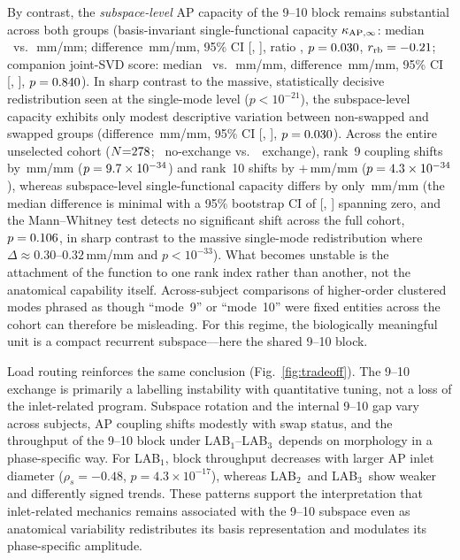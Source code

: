 \documentclass[11pt]{article}
\newcommand{\LABone}{LAB$_1$}
\newcommand{\LABtwo}{LAB$_2$}
\newcommand{\LABthree}{LAB$_3$}
\newcommand{\LAB}{LAB$_1$--LAB$_3$}
\begin{document}
By contrast, the \emph{subspace-level} AP capacity of the 9--10 block remains substantial across both groups (basis-invariant single-functional capacity $\kappa_{{\rm AP},\infty}$: median \ScalarAPNo\ vs.\ \ScalarAPYes\,mm/mm; difference \ScalarAPDifference\,mm/mm, 95\% CI [\ScalarAPLow, \ScalarAPHigh], ratio \ScalarAPRatio, $p = 0.030$, $r_{\rm rb} = -0.21$; companion joint-SVD score: median \PairAPNo\ vs.\ \PairAPYes\,mm/mm, difference \PairAPDifference\,mm/mm, 95\% CI [\PairAPLow, \PairAPHigh], $p = 0.840$).
In sharp contrast to the massive, statistically decisive redistribution seen at the single-mode level ($p < 10^{-21}$), the subspace-level capacity exhibits only modest descriptive variation between non-swapped and swapped groups (difference \ScalarAPDifference\,mm/mm, 95\% CI [\ScalarAPLow, \ScalarAPHigh], $p = 0.030$).
Across the entire unselected cohort ($N{=}278$; \CohortNoSwapN\ no-exchange vs.\ \CohortSwapN\ exchange), rank~9 coupling shifts by \CohortRankNineDifference\,mm/mm ($p = 9.7 \times 10^{-34}$) and rank~10 shifts by $+$\CohortRankTenDifference\,mm/mm ($p = 4.3 \times 10^{-34}$), whereas subspace-level single-functional capacity differs by only \CohortScalarAPDifference\,mm/mm (the median difference is minimal with a 95\% bootstrap CI of [\CohortScalarAPLow, \CohortScalarAPHigh] spanning zero, and the Mann--Whitney test detects no significant shift across the full cohort, $p = 0.106$, in sharp contrast to the massive single-mode redistribution where $\Delta \approx 0.30$--$0.32$\,mm/mm and $p < 10^{-33}$).
What becomes unstable is the attachment of the function to one rank index rather than another, not the anatomical capability itself.
Across-subject comparisons of higher-order clustered modes phrased as though ``mode~9'' or ``mode~10'' were fixed entities across the cohort can therefore be misleading.
For this regime, the biologically meaningful unit is a compact recurrent subspace---here the shared 9--10 block.

Load routing reinforces the same conclusion (Fig.~\ref{fig:tradeoff}).
The 9--10 exchange is primarily a labelling instability with quantitative tuning, not a loss of the inlet-related program.
Subspace rotation and the internal 9--10 gap vary across subjects, AP coupling shifts modestly with swap status, and the throughput of the 9--10 block under \LAB\ depends on morphology in a phase-specific way.
For \LABone, block throughput decreases with larger AP inlet diameter ($\rho_s{=}{-}0.48$, $p{=}4.3\times10^{-17}$), whereas \LABtwo\ and \LABthree\ show weaker and differently signed trends.
These patterns support the interpretation that inlet-related mechanics remains associated with the 9--10 subspace even as anatomical variability redistributes its basis representation and modulates its phase-specific amplitude.
\end{document}
